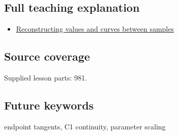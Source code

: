 \subsection{Full teaching explanation}\label{full-teaching-explanation}

\begin{itemize}
\tightlist
\item
  \href{Continuous\%20Notes/Computing\%20Foundations\%20-\%20From\%20Bits\%20to\%20C++\%20and\%20Systems\%20APIs\#Reconstructing\%20values\%20and\%20curves\%20between\%20samples}{Reconstructing values and curves between samples}
\end{itemize}

\subsection{Source coverage}\label{source-coverage}

Supplied lesson parts: 981.

\subsection{Future keywords}\label{future-keywords}

endpoint tangents, C1 continuity, parameter scaling
